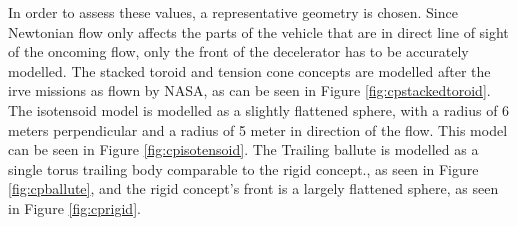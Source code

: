 In order to assess these values, a representative geometry is chosen. Since Newtonian flow only affects the parts of the vehicle that are in direct line of sight of the oncoming flow, only the front of the decelerator has to be accurately modelled. The stacked toroid and tension cone concepts are modelled after the \gls{irve} missions as flown by NASA, as can be seen in Figure \ref{fig:cpstackedtoroid}. The isotensoid model is modelled as a slightly flattened sphere, with a radius of 6 meters perpendicular and a radius of 5 meter in direction of the flow. This model can be seen in Figure \ref{fig:cpisotensoid}. The Trailing ballute is modelled as a single torus trailing body comparable to the rigid concept., as seen in Figure \ref{fig:cpballute}, and the rigid concept's front is a largely flattened sphere, as seen in Figure \ref{fig:cprigid}.


